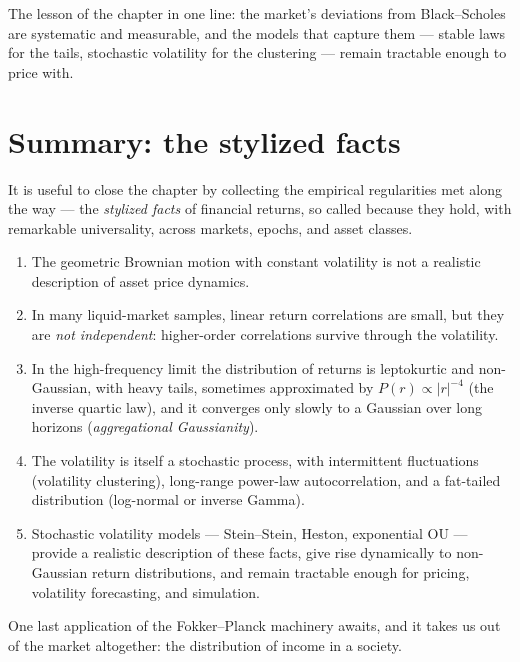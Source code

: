 The lesson of the chapter in one line: the market's deviations from Black--Scholes are systematic and measurable, and the models that capture them --- stable laws for the tails, stochastic volatility for the clustering --- remain tractable enough to price with.

\section{Summary: the stylized facts}

It is useful to close the chapter by collecting the empirical regularities met along the way --- the \emph{stylized facts} of financial returns, so called because they hold, with remarkable universality, across markets, epochs, and asset classes\cite{Cont2001}.
\begin{enumerate}
    \item The geometric Brownian motion with constant volatility is not a realistic description of asset price dynamics.
    \item In many liquid-market samples, linear return correlations are small, but they are \emph{not independent}: higher-order correlations survive through the volatility.
    \item In the high-frequency limit the distribution of returns is leptokurtic and non-Gaussian, with heavy tails, sometimes approximated by $P(r)\propto |r|^{-4}$ (the inverse quartic law), and it converges only slowly to a Gaussian over long horizons (\emph{aggregational Gaussianity}).
    \item The volatility is itself a stochastic process, with intermittent fluctuations (volatility clustering), long-range power-law autocorrelation, and a fat-tailed distribution (log-normal or inverse Gamma).
    \item Stochastic volatility models --- Stein--Stein, Heston, exponential OU --- provide a realistic description of these facts, give rise dynamically to non-Gaussian return distributions, and remain tractable enough for pricing, volatility forecasting, and simulation.
\end{enumerate}
One last application of the Fokker--Planck machinery awaits, and it takes us out of the market altogether: the distribution of income in a society.
